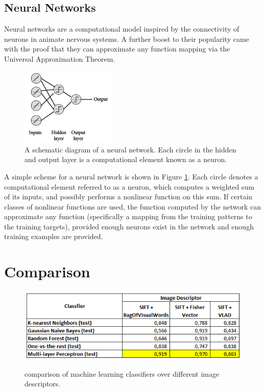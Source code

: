 \documentclass[12pt]{article}
\numberwithin{equation}{section}
\numberwithin{table}{section}
\numberwithin{figure}{section}
\begin{document}
\subsection{Neural Networks} \label{neuralnetwork}

Neural networks are a computational model inspired by the connectivity of neurons in animate nervous systems.
A further boost to their popularity came with the proof that they can approximate any function mapping via the Universal Approximation Theorem. 

\begin{figure}[H] \centering
	\includegraphics[width=0.4\textwidth]{image5.png}
	\caption{A schematic diagram of a neural network. Each circle in the hidden and output layer is a computational element known as a neuron. }
	\label{figure5}
\end{figure}


A simple scheme for a neural network is shown in Figure \ref{figure5}. Each circle denotes a computational element referred to as a neuron, which computes a weighted sum of its inputs, and possibly performs a nonlinear function on this sum. If certain classes of nonlinear functions are used, the function computed by the network can approximate any function (specifically a mapping from the training patterns to the training targets), provided enough neurons exist in the network and enough training examples are provided.



\section{Comparison} \label{Comparison}


\begin{figure}[H] \centering
	\caption{comparison of machine learning classifiers over different image descriptors. }
	\includegraphics[width=1\textwidth]{class.png}
	\label{class}
\end{figure}
\end{document}
